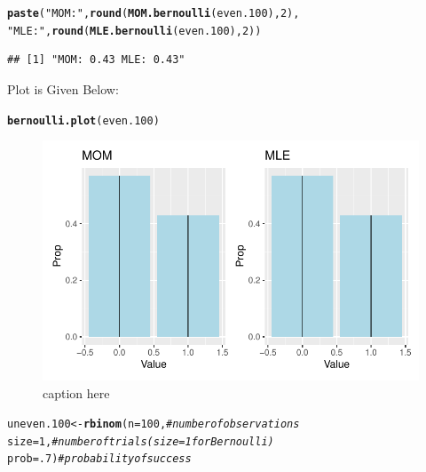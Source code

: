 \documentclass{article}\usepackage[]{graphicx}\usepackage[]{color}
\makeatletter
\def\maxwidth{ %
  \ifdim\Gin@nat@width>\linewidth
    \linewidth
  \else
    \Gin@nat@width
  \fi
}
\newcommand{\hlnum}[1]{\textcolor[rgb]{0.686,0.059,0.569}{#1}}%
\newcommand{\hlstr}[1]{\textcolor[rgb]{0.192,0.494,0.8}{#1}}%
\newcommand{\hlcom}[1]{\textcolor[rgb]{0.678,0.584,0.686}{\textit{#1}}}%
\newcommand{\hlstd}[1]{\textcolor[rgb]{0.345,0.345,0.345}{#1}}%
\newcommand{\hlkwb}[1]{\textcolor[rgb]{0.69,0.353,0.396}{#1}}%
\newcommand{\hlkwc}[1]{\textcolor[rgb]{0.333,0.667,0.333}{#1}}%
\newcommand{\hlkwd}[1]{\textcolor[rgb]{0.737,0.353,0.396}{\textbf{#1}}}%
\newenvironment{kframe}{%
 \def\at@end@of@kframe{}%
 \ifinner\ifhmode%
  \def\at@end@of@kframe{\end{minipage}}%
  \begin{minipage}{\columnwidth}%
 \fi\fi%
 \def\FrameCommand##1{\hskip\@totalleftmargin \hskip-\fboxsep
 \colorbox{shadecolor}{##1}\hskip-\fboxsep
     \hskip-\linewidth \hskip-\@totalleftmargin \hskip\columnwidth}%
 \MakeFramed {\advance\hsize-\width
   \@totalleftmargin\z@ \linewidth\hsize
   \@setminipage}}%
 {\par\unskip\endMakeFramed%
 \at@end@of@kframe}
\newenvironment{knitrout}{}{} %
\makeatother
\begin{document}
\begin{enumerate}
\begin{enumerate}
\begin{knitrout}
\begin{kframe}
\begin{alltt}
\hlkwd{paste}\hlstd{(}\hlstr{"MOM:"}\hlstd{,} \hlkwd{round}\hlstd{(}\hlkwd{MOM.bernoulli}\hlstd{(even.100),}\hlnum{2}\hlstd{),}
      \hlstr{"MLE:"}\hlstd{,} \hlkwd{round}\hlstd{(}\hlkwd{MLE.bernoulli}\hlstd{(even.100),} \hlnum{2}\hlstd{))}
\end{alltt}
\begin{verbatim}
## [1] "MOM: 0.43 MLE: 0.43"
\end{verbatim}
\end{kframe}
\end{knitrout}
Plot is Given Below:
\begin{knitrout}
\color{fgcolor}\begin{kframe}
\begin{alltt}
\hlkwd{bernoulli.plot}\hlstd{(even.100)}
\end{alltt}
\end{kframe}
\end{knitrout}
\begin{figure}[H]
  \begin{center}
\begin{knitrout}
\color{fgcolor}
\includegraphics[width=\maxwidth]{figure/unnamed-chunk-12-1} 
\end{knitrout}
    \caption{caption here}
    \label{p4plot5}%
  \end{center}
\end{figure}
\begin{knitrout}
\color{fgcolor}\begin{kframe}
\begin{alltt}
\hlstd{uneven.100} \hlkwb{<-} \hlkwd{rbinom}\hlstd{(}\hlkwc{n}\hlstd{=}\hlnum{100}\hlstd{,}        \hlcom{#number of observations}
                    \hlkwc{size}\hlstd{=}\hlnum{1}\hlstd{,}        \hlcom{#number of trials (size=1 for Bernoulli)}
                    \hlkwc{prob}\hlstd{=}\hlnum{.7}\hlstd{)}       \hlcom{#probability of success}


\end{alltt}
\end{kframe}
\end{knitrout}
\end{enumerate}
\end{enumerate}
\end{document}
